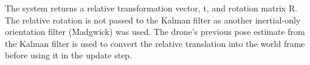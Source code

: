 \documentclass[bare_jrnl_transmag]{subfiles}
\begin{document}
The system returns a relative transformation vector, t, and rotation matrix R. The relative rotation is not passed to the Kalman filter as another inertial-only orientation filter (Madgwick) was used. The drone's previous pose estimate from the Kalman filter is used to convert the relative translation into the world frame before using it in the update step.
\end{document}
